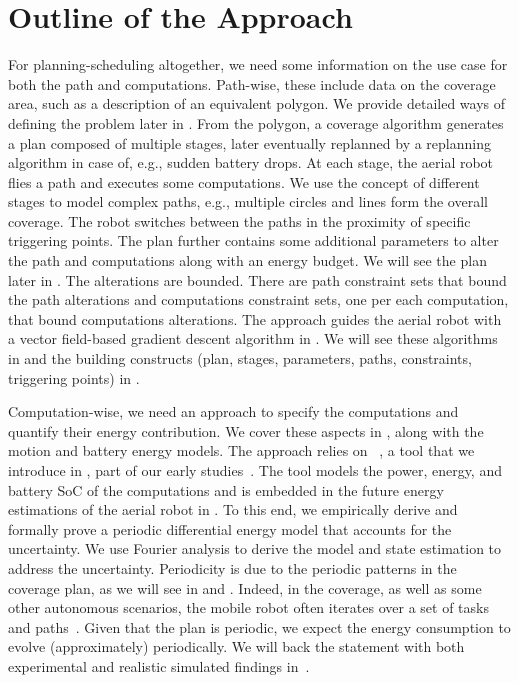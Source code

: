 \section{Outline of the Approach}
\label{sec:outline}

For planning-scheduling altogether, we need some information on the use case for both the path and computations. Path-wise, these include data on the coverage area, such as a description of an equivalent polygon. We provide detailed ways of defining the problem later in . From the polygon, a coverage algorithm generates a plan composed of multiple stages, later eventually replanned by a replanning algorithm in case of, e.g., sudden battery drops. At each stage, the aerial robot flies a path and executes some computations. We use the concept of different stages to model complex paths, e.g., multiple circles and lines form the overall coverage. The robot switches between the paths in the proximity of specific triggering points. The plan further contains some additional parameters to alter the path and computations along with an energy budget. We will see the plan later in . The alterations are bounded. There are path constraint sets that bound the path alterations and computations constraint sets, one per each computation, that bound computations alterations. The approach guides the aerial robot with a vector field-based gradient descent algorithm in . We will see these algorithms in  and the building constructs (plan, stages, parameters, paths, constraints, triggering points) in .

Computation-wise, we need an approach to specify the computations and quantify their energy contribution. We cover these aspects in , along with the motion and battery energy models. The approach relies on \powprof{}~\citep{powprofiler}, a tool that we introduce in , part of our early studies~\citep{seewald2019component,seewald2019coarse}. The tool models the power, energy, and battery SoC of the computations and is embedded in the future energy estimations of the aerial robot in . To this end, we empirically derive and formally prove a periodic differential energy model that accounts for the uncertainty. We use Fourier analysis to derive the model and state estimation to address the uncertainty. Periodicity is due to the periodic patterns in the coverage plan, as we will see in  and . Indeed, in the coverage, as well as some other autonomous scenarios, the mobile robot often iterates over a set of tasks and paths~\citep{seewald2020mechanical,seewald202Xenergy}. Given that the plan is periodic, we expect the energy consumption to evolve (approximately) periodically. We will back the statement with both experimental and realistic simulated findings in~.

